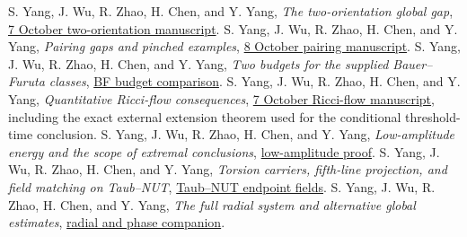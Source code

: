 \documentclass[11pt,a4paper]{article}
\theoremstyle{definition}
\theoremstyle{remark}
\newcommand{\repo}[2]{\href{https://github.com/Cherish0925/Geometric-Analysis/blob/main/#1}{#2}}
\begin{document}
\begin{thebibliography}{99}
 S. Yang, J. Wu, R. Zhao, H. Chen, and Y. Yang, \emph{The two-orientation global gap}, \repo{archive/originals/2026-10-07/Line1_Two_Orientation_Global_Gap.md}{7 October two-orientation manuscript}.
 S. Yang, J. Wu, R. Zhao, H. Chen, and Y. Yang, \emph{Pairing gaps and pinched examples}, \repo{archive/originals/2026-10-08/Pair_Gap_and_Pinched_Example.tex}{8 October pairing manuscript}.
 S. Yang, J. Wu, R. Zhao, H. Chen, and Y. Yang, \emph{Two budgets for the supplied Bauer--Furuta classes}, \repo{research/packages/20261007_Einstein_Gaps_Two_Sessions--9d4f2de3/20261007_Einstein_Gaps_Two_Sessions/sources/Skills/geometric-analysis/research/paper/sections/bf_budget_comparison.tex}{BF budget comparison}.
 S. Yang, J. Wu, R. Zhao, H. Chen, and Y. Yang, \emph{Quantitative Ricci-flow consequences}, \repo{archive/originals/2026-10-07/03_Quantitative_Ricci_Flow.tex}{7 October Ricci-flow manuscript}, including the exact external extension theorem used for the conditional threshold-time conclusion.
 S. Yang, J. Wu, R. Zhao, H. Chen, and Y. Yang, \emph{Low-amplitude energy and the scope of extremal conclusions}, \repo{archive/originals/2026-09-29/O10_Low_Amplitude_Energy_and_O11_Scope.md}{low-amplitude proof}.
 S. Yang, J. Wu, R. Zhao, H. Chen, and Y. Yang, \emph{Torsion carriers, fifth-line projection, and field matching on Taub--NUT}, \repo{research/notes/taub_nut_endpoint_fields.md}{Taub--NUT endpoint fields}.
 S. Yang, J. Wu, R. Zhao, H. Chen, and Y. Yang, \emph{The full radial system and alternative global estimates}, \repo{archive/originals/2026-09-29/O10_Alternative_Global.md}{radial and phase companion}.
\end{thebibliography}
\end{document}
